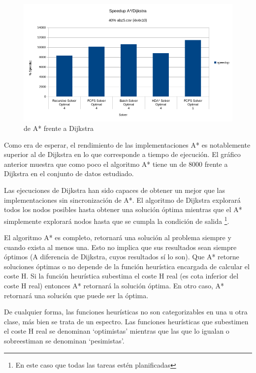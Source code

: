 \begin{figure}[h]
    \centering
    \includegraphics[width=\linewidth]{Media/Ch2/Speedup_Dijkstra.png}
    \caption{ de A* frente a Dijkstra}
    \label{fig:Speedup_Dijkstra}
\end{figure}

Como era de esperar, el rendimiento de las implementaciones A*
es notablemente superior al de Dijkstra en lo que corresponde
a tiempo de ejecución.
El gráfico anterior muestra que como poco el algoritmo A*
tiene un  de 8000 frente a Dijkstra
en el conjunto de datos estudiado.

Las ejecuciones de Dijkstra han sido capaces
de obtener un  mejor que
las implementaciones sin sincronización de A*.
El algoritmo de Dijkstra explorará todos los
nodos posibles hasta obtener una solución óptima
mientras que el A* simplemente explorará nodos
hasta que se cumpla la condición de salida
\footnote{En este caso que todas las tareas estén planificadas}.

El algoritmo A* es completo, retornará una solución al problema
siempre y cuando exista al menos una.
Esto no implica que sus resultados sean siempre óptimos
(A diferencia de Dijkstra, cuyos resultados sí lo son).
Que A* retorne soluciones óptimas o no depende de la función heurística
encargada de calcular el coste H.
Si la función heurística subestima el coste H real
(es cota inferior del coste H real)
entonces A* retornará la solución óptima.
En otro caso, A* retornará una solución que puede
ser la óptima.

De cualquier forma, las funciones heurísticas no son
categorizables en una u otra clase,
más bien se trata de un espectro.
Las funciones heurísticas que subestimen
el coste H real se denominan `optimistas'
mientras que las que lo igualan o sobreestiman
se denominan `pesimistas'.


